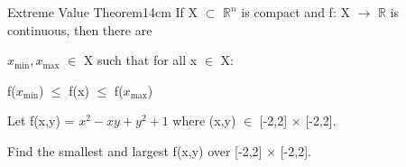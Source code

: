     \vspace{0.5cm}



    \begin{wtheorem}{Extreme Value Theorem}{14cm}
        If X $\subset$ $\mathbb{R}^n$ is compact and
        f: X $\rightarrow$ $\mathbb{R}$ is continuous, then there are

        $x_{\text{min}},x_{\text{max}}$ $\in$ X such that for all x $\in$ X:

        \hspace{0.5cm}
        f($x_{\text{min}}$) $\leq$ f(x) $\leq$ f($x_{\text{max}}$)
    \end{wtheorem}

    \vspace{0.5cm}



    \begin{example}
        Let f(x,y) = $x^2 - xy + y^2 + 1$ where (x,y) $\in$ [-2,2] $\times$ [-2,2].
        
        Find the smallest and largest f(x,y) over [-2,2] $\times$ [-2,2].
    \end{example}

